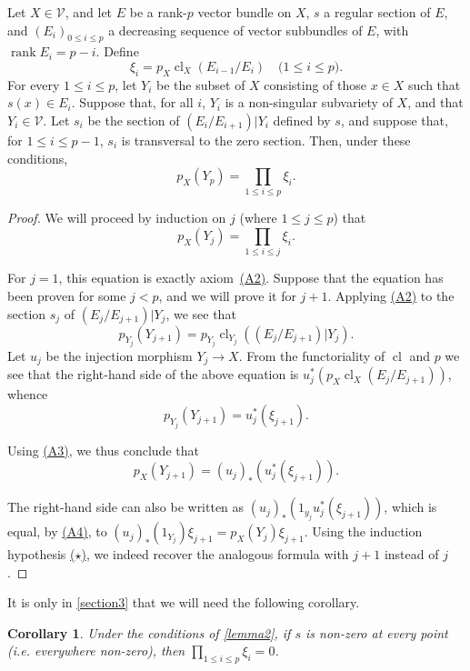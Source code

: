 \documentclass{article}
\theoremstyle{plain}
\newenvironment{lemma}[1]
    {\renewcommand\theinnercustomlemma{#1}\innercustomlemma}
    {\endinnercustomlemma}
\newtheorem*{corollary}{Corollary}
\theoremstyle{definition}
\newcommand{\cat}{\mathcal}
\renewcommand{\leq}{\leqslant}
\DeclareMathOperator{\rank}{rank}
\DeclareMathOperator{\cl}{cl}
\newcommand{\oldpage}[1]{\marginpar{\footnotesize$\Big\vert$ \textit{p.~#1}}}
\begin{document}
\begin{lemma}{2}
\label{lemma2}
  Let $X\in\cat{V}$, and let $E$ be a rank-$p$ vector bundle on $X$, $s$ a regular section of $E$, and $(E_i)_{0\leq i\leq p}$ a decreasing sequence of vector subbundles of $E$, with $\rank E_i=p-i$.
  Define
  \[
    \xi_i = p_X\cl_X(E_{i-1}/E_i)
    \quad\mbox{($1\leq i\leq p$).}
  \]
  For every $1\leq i\leq p$, let $Y_i$ be the subset of $X$ consisting of those $x\in X$ such that $s(x)\in E_i$.
  Suppose that, for all $i$, $Y_i$ is a non-singular subvariety of $X$, and that $Y_i\in\cat{V}$.
  Let $s_i$ be the section of $(E_i/E_{i+1})|Y_i$ defined by $s$, and suppose that, for $1\leq i\leq p-1$, $s_i$ is transversal to the zero section.
  Then, under these conditions,
  \[
    p_X(Y_p) = \prod_{1\leq i\leq p}\xi_i.
  \]
\end{lemma}

\begin{proof}
  We will proceed by induction on $j$ (where $1\leq j\leq p$) that
  \[
    \label{lemma2equationstar}
    p_X(Y_j) = \prod_{1\leq i\leq j}\xi_i.
    \tag{$\star$}
  \]

  For $j=1$, this equation is exactly axiom~\hyperref[axiomA2]{(A2)}.
  Suppose that the equation has been proven for some $j<p$, and we will prove it for $j+1$.
  Applying \hyperref[axiomA2]{(A2)} to the section $s_j$ of $(E_j/E_{j+1})|Y_j$, we see that
  \[
    p_{Y_j}(Y_{j+1}) = p_{Y_j}\cl_{Y_j}((E_j/E_{j+1})|Y_j).
  \]
  Let $u_j$ be the injection morphism $Y_j\to X$.
  From the functoriality of $\cl$ and $p$ we see that the right-hand side of the above equation is $u_j^*(p_X\cl_X(E_j/E_{j+1}))$, whence
  \[
    p_{Y_j}(Y_{j+1}) = u_j^*(\xi_{j+1}).
  \]

  \oldpage{142}
  Using \hyperref[axiomA3]{(A3)}, we thus conclude that
  \[
    p_X(Y_{j+1}) = (u_j)_*(u_j^*(\xi_{j+1})).
  \]

  The right-hand side can also be written as $(u_j)_*(1_{y_j}u_j^*(\xi_{j+1}))$, which is equal, by \hyperref[axiomA4]{(A4)}, to $(u_j)_*(1_{Y_j})\xi_{j+1} = p_X(Y_j)\xi_{j+1}$.
  Using the induction hypothesis \hyperref[lemma2equationstar]{($\star$)}, we indeed recover the analogous formula with $j+1$ instead of $j$.
\end{proof}

It is only in \cref{section3} that we will need the following corollary.
\begin{corollary}
\label{lemma2corollary}
  Under the conditions of \cref{lemma2}, if $s$ is non-zero at every point (i.e. everywhere non-zero), then $\prod_{1\leq i\leq p}\xi_i=0$.
\end{corollary}
\end{document}

